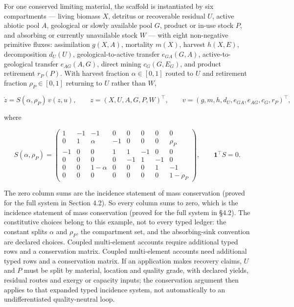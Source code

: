 \documentclass[11pt]{article}
\begin{document}
For one conserved limiting material, the scaffold is instantiated by six compartments --- living biomass \(X\), detritus or recoverable residual \(U\), active abiotic pool \(A\), geological or slowly available pool \(G\), product or in-use stock \(P\), and absorbing or currently unavailable stock \(W\) --- with eight non-negative primitive fluxes: assimilation \(g(X,A)\), mortality \(m(X)\), harvest \(h(X,E)\), decomposition \(d_U(U)\), geological-to-active transfer \(e_{GA}(G,A)\), active-to-geological transfer \(e_{AG}(A,G)\), direct mining \(c_G(G,E_G)\), and product retirement \(r_P(P)\). With harvest fraction \(\alpha \in [0,1]\) routed to \(U\) and retirement fraction \(\rho_P \in [0,1]\) returning to \(U\) rather than \(W\), 

$$\dot z = S(\alpha, \rho_P)\, v(z, u), \qquad z = (X, U, A, G, P, W)^\top, \qquad v = (g, m, h, d_U, e_{GA}, e_{AG}, c_G, r_P)^\top,$$

 where 

$$S(\alpha, \rho_P) = \begin{pmatrix} 1 & -1 & -1 & 0 & 0 & 0 & 0 & 0 \\ 0 & 1 & \alpha & -1 & 0 & 0 & 0 & \rho_P \\ -1 & 0 & 0 & 1 & 1 & -1 & 0 & 0 \\ 0 & 0 & 0 & 0 & -1 & 1 & -1 & 0 \\ 0 & 0 & 1-\alpha & 0 & 0 & 0 & 1 & -1 \\ 0 & 0 & 0 & 0 & 0 & 0 & 0 & 1-\rho_P \end{pmatrix}, \qquad \mathbf{1}^\top S = 0.$$

 The zero column sums are the incidence statement of mass conservation (proved for the full system in Section 4.2). So every column sums to zero, which is the incidence statement of mass conservation (proved for the full system in \S4.2). The constitutive choices belong to this example, not to every typed ledger: the constant splits \(\alpha\) and \(\rho_P\), the compartment set, and the absorbing-sink convention are declared choices. Coupled multi-element accounts require additional typed rows and a conservation matrix. Coupled multi-element accounts need additional typed rows and a conservation matrix. If an application makes recovery claims, \(U\) and \(P\) must be split by material, location and quality grade, with declared yields, residual routes and exergy or capacity inputs; the conservation argument then applies to that expanded typed incidence system, not automatically to an undifferentiated quality-neutral loop.
\end{document}
